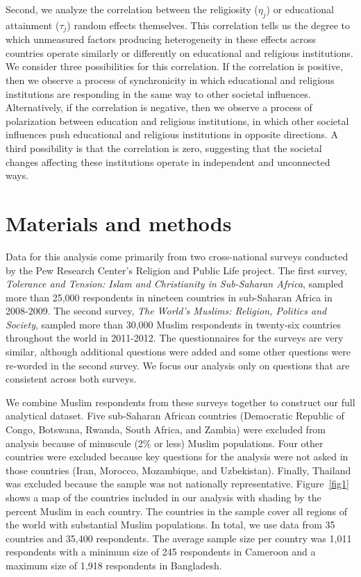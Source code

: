 \documentclass[10pt,letterpaper]{article}
\begin{document}
Second, we analyze the correlation between the religiosity (\(\eta_j\))
or educational attainment (\(\tau_j\)) random effects themselves. This
correlation tells us the degree to which unmeasured factors producing
heterogeneity in these effects across countries operate similarly or
differently on educational and religious institutions. We consider three
possibilities for this correlation. If the correlation is positive, then
we observe a process of synchronicity in which educational and religious
institutions are responding in the same way to other societal
influences. Alternatively, if the correlation is negative, then we
observe a process of polarization between education and religious
institutions, in which other societal influences push educational and
religious institutions in opposite directions. A third possibility is
that the correlation is zero, suggesting that the societal changes
affecting these institutions operate in independent and unconnected
ways.

\section*{Materials and methods}

Data for this analysis come primarily from two cross-national surveys
conducted by the Pew Research Center's Religion and Public Life project.
The first survey, \emph{Tolerance and Tension: Islam and Christianity in
Sub-Saharan Africa}, sampled more than 25,000 respondents in nineteen
countries in sub-Saharan Africa in 2008-2009. The second survey,
\emph{The World's Muslims: Religion, Politics and Society}, sampled more
than 30,000 Muslim respondents in twenty-six countries throughout the
world in 2011-2012. The questionnaires for the surveys are very similar,
although additional questions were added and some other questions were
re-worded in the second survey. We focus our analysis only on questions
that are consistent across both surveys.

We combine Muslim respondents from these surveys together to construct
our full analytical dataset. Five sub-Saharan African countries
(Democratic Republic of Congo, Botswana, Rwanda, South Africa, and
Zambia) were excluded from analysis because of minuscule (2\% or less)
Muslim populations. Four other countries were excluded because key
questions for the analysis were not asked in those countries (Iran,
Morocco, Mozambique, and Uzbekistan). Finally, Thailand was excluded
because the sample was not nationally representative. Figure~\ref{fig1} shows a
map of the countries included in our analysis with shading by the
percent Muslim in each country. The countries in the sample cover all
regions of the world with substantial Muslim populations. In total, we
use data from 35 countries and 35,400 respondents. The average sample
size per country was 1,011 respondents with a minimum size of 245
respondents in Cameroon and a maximum size of 1,918 respondents in
Bangladesh.
\end{document}
